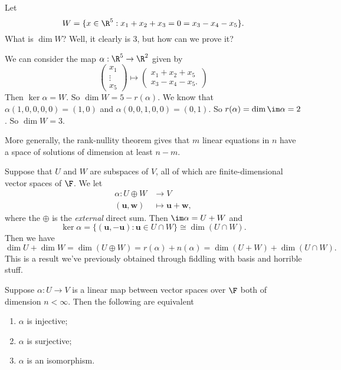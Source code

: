 \documentclass[a4paper]{article}
\begin{document}
\begin{eg}
  Let
  \[
    W = \{x\in \R^5: x_1 + x_2 + x_3 = 0 = x_3 - x_4 - x_5\}.
  \]
  What is $\dim W$? Well, it clearly is $3$, but how can we prove it?

  We can consider the map $\alpha: \R^5 \to \R^2$ given by
  \[
    \begin{pmatrix}
      x_1\\\vdots \\ x_5
    \end{pmatrix}
    \mapsto
    \begin{pmatrix}
      x_1 + x_2 + x_5\\
      x_3 - x_4 - x_5.
    \end{pmatrix}
  \]
  Then $\ker \alpha = W$. So $\dim W = 5 - r(\alpha)$. We know that $\alpha(1, 0, 0, 0, 0) = (1, 0)$ and $\alpha(0, 0, 1, 0, 0) = (0, 1)$. So $r(\alpha) = \dim \im \alpha = 2$. So $\dim W = 3$.
\end{eg}
More generally, the rank-nullity theorem gives that $m$ linear equations in $n$ have a space of solutions of dimension at least $n - m$.

\begin{eg}
  Suppose that $U$ and $W$ are subspaces of $V$, all of which are finite-dimensional vector spaces of $\F$. We let
  \begin{align*}
    \alpha: U\oplus W &\to V\\
    (\mathbf{u}, \mathbf{w}) &\mapsto \mathbf{u} + \mathbf{w},
  \end{align*}
  where the $\oplus$ is the \emph{external} direct sum. Then $\im \alpha =U + W$ and
  \[
    \ker \alpha = \{(\mathbf{u}, -\mathbf{u}): \mathbf{u}\in U\cap W\} \cong \dim (U\cap W).
  \]
  Then we have
  \[
    \dim U + \dim W = \dim (U\oplus W) = r(\alpha) + n(\alpha) = \dim(U + W) + \dim (U\cap W).
  \]
  This is a result we've previously obtained through fiddling with basis and horrible stuff.
\end{eg}

\begin{cor}
  Suppose $\alpha: U\to V$ is a linear map between vector spaces over $\F$ both of dimension $n < \infty$. Then the following are equivalent
  \begin{enumerate}
    \item $\alpha$ is injective;
    \item $\alpha$ is surjective;
    \item $\alpha$ is an isomorphism.
  \end{enumerate}
\end{cor}
\end{document}
